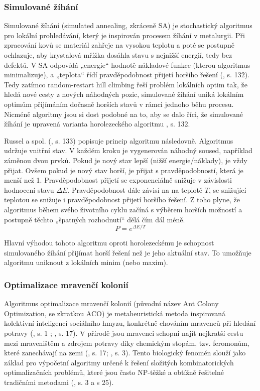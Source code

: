 \documentclass[a4paper, twoside, 12pt, czech]{article}
\begin{document}
\subsubsection{Simulované žíhání}
Simulované žíhání (simulated annealing, zkráceně SA) je stochastický algoritmus 
pro lokální prohledávání, který je inspirován procesem žíhání v metalurgii. Při 
zpracování kovů se materiál zahřeje na vysokou teplotu a poté se postupně 
ochlazuje, aby krystalová mřížka dosáhla stavu s nejnižší energií, tedy bez 
defektů. V SA odpovídá „energie“ hodnotě nákladové funkce (kterou algoritmus 
minimalizuje), a „teplota“ řídí pravděpodobnost přijetí horšího řešení 
(\cite{aiModernApproach}, s. 132). Tedy zatímco random-restart hill climbing
řeší problém lokálních optim tak, že hledá nové cesty z nových náhodných pozic, 
simulované žíhání uniká lokálním optimům přijímáním dočasně horších stavů v rámci 
jednoho běhu procesu. Nicméně algoritmy jsou si dost podobné na to, aby se dalo 
říci, že simulované žíhání je upravená varianta horolezeckého algoritmu 
\cite{aiModernApproach}, s. 132.

Russel a spol. (\cite{aiModernApproach}, s. 133) popisuje princip algoritmu následovně. 
Algoritmus udržuje vnitřní stav. V každém kroku je vygenerován náhodný soused, 
například záměnou dvou prvků. Pokud je nový stav lepší (nižší energie/náklady), 
je vždy přijat. Ovšem pokud je nový stav horší, je přijat s pravděpodobností, 
která je menší než 1. Pravděpodobnost přijetí se exponenciálně snižuje v závislosti 
hodnocení stavu $\Delta E$. Pravděpodobnost dále závisí na na teplotě $T$, 
se snižující teplotou se snižuje i pravděpodobnost přijetí horšího řešení. Z 
toho plyne, že algoritmus během svého životního cyklu začíná s výběrem horších 
možností a postupně těchto „špatných rozhodnutí“ dělá čím dál méně.
\begin{equation*}
    P = e^{\Delta E / T}
\end{equation*}

Hlavní výhodou tohoto algoritmu oproti horolezeckému je schopnost simulovaného 
žíhání přijímat horší řešení než je jeho aktuální stav. To umožňuje algoritmu 
uniknout z lokálních minim (nebo maxim).



\subsubsection{Optimalizace mravenčí kolonií}
Algoritmus optimalizace mravenčí kolonií (původní název Ant Colony Optimization, 
se zkratkou ACO)
je metaheuristická metoda inspirovaná kolektivní inteligencí 
sociálního hmyzu, konkrétně chováním mravenců při hledání potravy 
(\cite{Fidanova2021-qg}, s. 1 ; \cite{Abraham2022-xu}, s. 17).
V přírodě jsou mravenci schopni najít nejkratší cestu mezi mraveništěm a zdrojem 
potravy díky chemickým stopám, tzv. feromonům, které zanechávají na zemi 
(\cite{Abraham2022-xu}, s. 17; \cite{Fidanova2021-qg}, s. 3).
Tento biologický fenomén slouží jako základ pro výpočetní algoritmy určené k řešení
složitých kombinatorických optimalizačních problémů, které jsou často NP-těžké a
obtížně řešitelné tradičními metodami (\cite{Fidanova2021-qg}, s. 3 a s 25).
\end{document}

